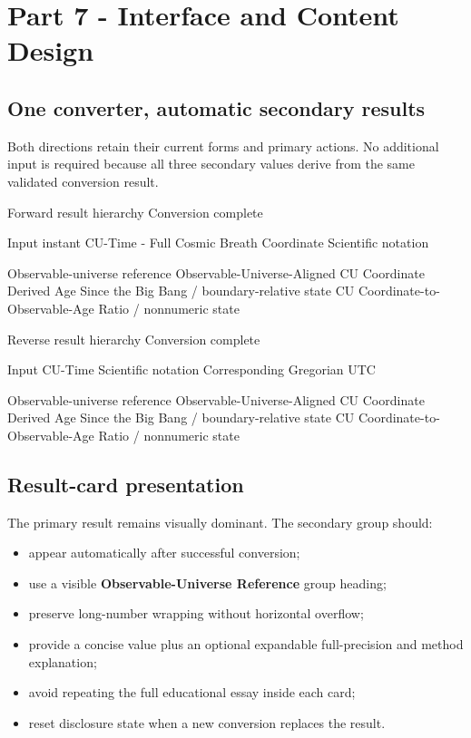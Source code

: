 \documentclass[11pt,letterpaper]{article}
\newcommand{\term}[1]{\textbf{\textsf{#1}}}
\begin{document}
\section{Part 7 - Interface and Content Design}

\subsection{One converter, automatic secondary results}

Both directions retain their current forms and primary actions. No additional
input is required because all three secondary values derive from the same
validated conversion result.

\begin{codebox}{Forward result hierarchy}
Conversion complete

Input instant
CU-Time - Full Cosmic Breath Coordinate
Scientific notation

Observable-universe reference
  Observable-Universe-Aligned CU Coordinate
  Derived Age Since the Big Bang / boundary-relative state
  CU Coordinate-to-Observable-Age Ratio / nonnumeric state
\end{codebox}

\begin{codebox}{Reverse result hierarchy}
Conversion complete

Input CU-Time
Scientific notation
Corresponding Gregorian UTC

Observable-universe reference
  Observable-Universe-Aligned CU Coordinate
  Derived Age Since the Big Bang / boundary-relative state
  CU Coordinate-to-Observable-Age Ratio / nonnumeric state
\end{codebox}

\subsection{Result-card presentation}

The primary result remains visually dominant. The secondary group should:

\begin{itemize}
    \item appear automatically after successful conversion;
    \item use a visible \term{Observable-Universe Reference} group heading;
    \item preserve long-number wrapping without horizontal overflow;
    \item provide a concise value plus an optional expandable full-precision
          and method explanation;
    \item avoid repeating the full educational essay inside each card;
    \item reset disclosure state when a new conversion replaces the result.
\end{itemize}
\end{document}
